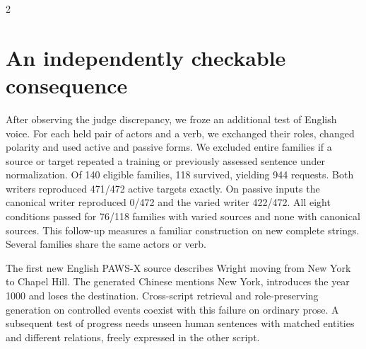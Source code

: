 \begin{multicols}{2}
\section*{An independently checkable consequence}
After observing the judge discrepancy, we froze an additional test of English voice. For each held pair of actors and a verb, we exchanged their roles, changed polarity and used active and passive forms. We excluded entire families if a source or target repeated a training or previously assessed sentence under normalization. Of 140 eligible families, 118 survived, yielding 944 requests. Both writers reproduced 471/472 active targets exactly. On passive inputs the canonical writer reproduced 0/472 and the varied writer 422/472. All eight conditions passed for 76/118 families with varied sources and none with canonical sources. This follow-up measures a familiar construction on new complete strings. Several families share the same actors or verb.
\par The first new English PAWS-X source describes Wright moving from New York to Chapel Hill. The generated Chinese mentions New York, introduces the year 1000 and loses the destination. Cross-script retrieval and role-preserving generation on controlled events coexist with this failure on ordinary prose. A subsequent test of progress needs unseen human sentences with matched entities and different relations, freely expressed in the other script.
\end{multicols}
